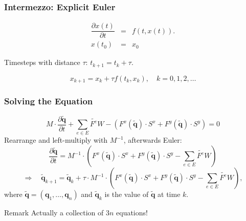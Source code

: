 \documentclass{beamer}
\newcommand{\pd}[2]{\dfrac{\partial #1}{\partial #2}}
\begin{document}
\begin{frame}
\begin{figure}[ht]
{
  }
\end{figure}

\end{frame}

\begin{frame}
  \frametitle{Intermezzo: Explicit Euler}
\begin{eqnarray}
  \label{eq:euler-method-setting}
  \pd{x(t)}{t} &=& f(t, x(t)). \\
  x(t_0) &=& x_0
\end{eqnarray}

Timesteps with distance $\tau$: $t_{k+1} = t_k + \tau$.

\begin{equation}
  \label{eq:euler-step-solution}
  x_{k+1} = x_k + \tau f(t_k, x_k), \quad k=0,1,2,\dots
\end{equation}

\end{frame}

\begin{frame}
  \frametitle{Solving the Equation}
  \begin{equation*}
    M \cdot \pd{\tilde{\mathbf{q}}}{t} +
    \sum_{e \in E} \tilde{F^e} W -
    \left(F^x(\tilde{\mathbf{q}}) \cdot S^x +
      F^y(\tilde{\mathbf{q}}) \cdot S^y\right) = 0
  \end{equation*}
  Rearrange and left-multiply with $M^{-1}$, afterwards Euler:
  \begin{equation*}
    \pd{\tilde{\mathbf{q}}}{t} =
    M^{-1} \cdot \left(
      F^x(\tilde{\mathbf{q}}) \cdot S^x +
      F^y(\tilde{\mathbf{q}}) \cdot S^y -
      \sum_{e \in E} \tilde{F^e} W\right
    )
  \end{equation*}
  \begin{equation*}
    \Rightarrow \quad
    \tilde{\mathbf{q}}_{k+1} =
    \tilde{\mathbf{q}}_{k} +
    \tau \cdot M^{-1} \cdot \left(
      F^x(\tilde{\mathbf{q}}) \cdot S^x +
      F^y(\tilde{\mathbf{q}}) \cdot S^y -
      \sum_{e \in E} \tilde{F^e} W\right
    ),
  \end{equation*}
  where $\tilde{\mathbf{q}} = (\mathbf{q}_1,\dots,\mathbf{q}_n)$ and $\tilde{\mathbf{q}}_k$ is the value of $\tilde{\mathbf{q}}$ at time $k$.

  \begin{block}{Remark}
    Actually a collection of $3n$ equations!
  \end{block}
\end{frame}
\end{document}
